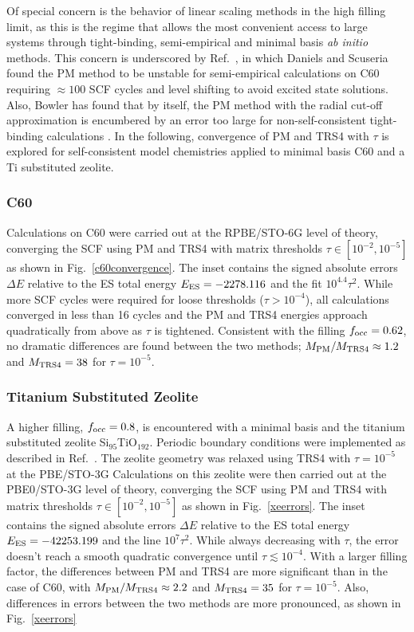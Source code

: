 \commentoutA{\documentclass[prl,aps,twocolumn,showpacs,twocolumngrid,superbib]{revtex4}}
\begin{document}
Of special concern is the behavior of linear scaling methods in the high filling limit,
as this is the regime that allows the most convenient access to large systems through
tight-binding, semi-empirical and minimal basis {\em ab initio} methods.
This concern is underscored by Ref.~, in which Daniels and Scuseria 
found the PM method to be unstable for semi-empirical calculations on C60 requiring  
$\approx 100$ SCF cycles and level shifting to avoid excited state solutions.
Also, Bowler has found that by itself, the PM method with the radial cut-off approximation 
is encumbered by an error too large for non-self-consistent tight-binding calculations \cite{DBowler99}.  
In the following,  convergence of PM and TRS4 with $\tau$ is explored for self-consistent model 
chemistries applied to minimal basis C60 and a Ti substituted zeolite.

\subsubsection{C60}

Calculations on C60 were carried out at the RPBE/STO-6G level of theory, converging the
SCF using PM and TRS4 with matrix thresholds $\tau \in [10^{-2},10^{-5}]$ as shown in Fig.~\ref{c60convergence}.  The inset contains 
the signed absolute errors $\Delta E$ relative to the ES total energy $E_{\rm ES}=-2278.116$ 
and the fit $10^{4.4} \tau^2$.  While more SCF cycles were required for loose thresholds ($\tau > 10^{-4}$), 
all calculations converged in less than 16 cycles and the PM and TRS4 energies approach 
quadratically from above as $\tau$ is tightened.  Consistent with the filling $f_{\rm occ}=0.62$, no dramatic
differences are found between the two methods; $M_{\rm PM}/M_{\rm TRS4} \approx 1.2$ and 
$M_{\rm TRS4}=38$ for $\tau=10^{-5}$.   

\subsubsection{Titanium Substituted Zeolite}

A higher filling, $f_{\rm occ}=0.8$, is encountered with a minimal basis and the titanium substituted zeolite 
Si$_{95}$TiO$_{192}$.  Periodic boundary conditions were implemented as described in Ref.~.    
The zeolite geometry was relaxed using TRS4 with $\tau = 10^{-5}$ at the PBE/STO-3G 
Calculations on this zeolite were then carried out at the PBE0/STO-3G level of theory,  
converging the SCF using PM and TRS4 with matrix thresholds $\tau \in [10^{-2},10^{-5}]$
as shown in Fig.~\ref{xeerrors}.  The inset contains 
the signed absolute errors $\Delta E$ relative to the ES total energy $E_{\rm ES}=-42253.199$ and the line 
$10^{7} \tau^2$.  While always decreasing with $\tau$, the error doesn't reach a smooth quadratic convergence 
until $\tau \lesssim 10^{-4}$.  With a larger filling factor, the differences between PM and TRS4 are more 
significant than in the case of C60, with $M_{\rm PM}/M_{\rm TRS4} \approx 2.2$ and $M_{\rm TRS4}=35$ for $\tau=10^{-5}$.  
Also, differences in errors between the two methods are more pronounced, as shown in Fig.~\ref{xeerrors}
\end{document}
